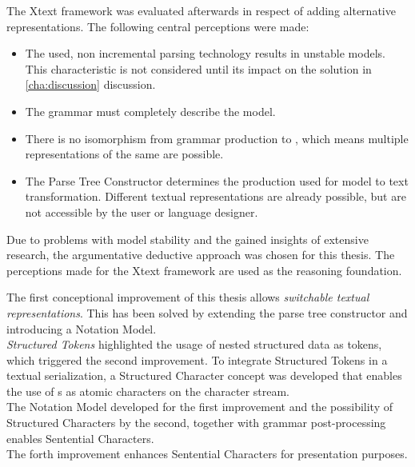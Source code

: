 The Xtext framework was evaluated afterwards in respect of adding alternative representations.
The following central perceptions were made:
\begin{itemize}
	\item The used, non incremental parsing technology results in unstable models. This characteristic is not considered until its impact on the solution in \ref{cha:discussion} discussion.
	\item The grammar must completely describe the model. 
	\item There is no isomorphism from grammar production to , which means multiple representations of the same  are possible.
	\item The Parse Tree Constructor determines the production used for model to text transformation. Different textual representations are already possible, but are not accessible by the user or language designer. \\
\end{itemize}

Due to problems with model stability and the gained insights of extensive research, the argumentative deductive approach was chosen for this thesis. The perceptions made for the Xtext framework are used as the reasoning foundation. 

The first conceptional improvement of this thesis allows \emph{switchable textual representations}. This has been solved by extending the parse tree constructor and introducing a Notation Model.\\

\emph{Structured Tokens} highlighted the usage of nested structured data as tokens, which triggered the second improvement. To integrate Structured Tokens in a textual serialization, a Structured Character concept was developed that enables the use of s as atomic characters on the character stream. \\

The Notation Model developed for the first improvement and the possibility of Structured Characters by the second, together with grammar post-processing enables Sentential Characters. \\

The forth improvement enhances Sentential Characters for presentation purposes.
